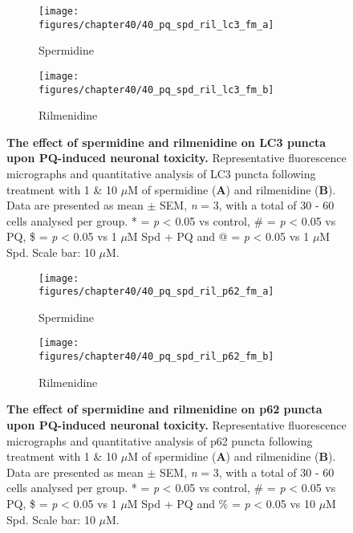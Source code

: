 \begin{figure}[!htbp]
  \center
  \begin{subfigure}[b]{0.495\linewidth}
    \texttt{[image: figures/chapter40/40\_pq\_spd\_ril\_lc3\_fm\_a]}
    \caption{Spermidine}
  \end{subfigure}
  \begin{subfigure}[b]{0.495\linewidth}
    \texttt{[image: figures/chapter40/40\_pq\_spd\_ril\_lc3\_fm\_b]}
    \caption{Rilmenidine}
  \end{subfigure}
  \caption[The effect of spermidine and rilmenidine on LC3 puncta upon PQ-induced neuronal toxicity]{\textbf{The effect of spermidine and rilmenidine on LC3 puncta upon PQ-induced neuronal toxicity.} Representative fluorescence micrographs and quantitative analysis of LC3 puncta following treatment with 1 \& 10 $\mu$M of spermidine (\textbf{A}) and rilmenidine (\textbf{B}). Data are presented as mean $\pm$ SEM, \textit{n} = 3, with a total of 30 - 60 cells analysed per group. * = \textit{p} < 0.05 vs control, \# = \textit{p} < 0.05 vs PQ, \$ = \textit{p} < 0.05 vs 1 $\mu$M Spd + PQ and @ = \textit{p} < 0.05 vs 1 $\mu$M Spd. Scale bar: 10 $\mu$M.}
  \label{fig:40_pq_spd_ril_lc3_fm_a}
\end{figure}

\begin{figure}[!htbp]
  \center
  \begin{subfigure}[b]{0.495\linewidth}
    \texttt{[image: figures/chapter40/40\_pq\_spd\_ril\_p62\_fm\_a]}
    \caption{Spermidine}
  \end{subfigure}
  \begin{subfigure}[b]{0.495\linewidth}
    \texttt{[image: figures/chapter40/40\_pq\_spd\_ril\_p62\_fm\_b]}
    \caption{Rilmenidine}
  \end{subfigure}
  \caption[The effect of spermidine and rilmenidine on p62 puncta upon PQ-induced neuronal toxicity]{\textbf{The effect of spermidine and rilmenidine on p62 puncta upon PQ-induced neuronal toxicity.} Representative fluorescence micrographs and quantitative analysis of p62 puncta following treatment with 1 \& 10 $\mu$M of spermidine (\textbf{A}) and rilmenidine (\textbf{B}). Data are presented as mean $\pm$ SEM, \textit{n} = 3, with a total of 30 - 60 cells analysed per group. * = \textit{p} < 0.05 vs control, \# = \textit{p} < 0.05 vs PQ, \$ = \textit{p} < 0.05 vs 1 $\mu$M Spd + PQ and \% = \textit{p} < 0.05 vs 10 $\mu$M Spd. Scale bar: 10 $\mu$M.}
  \label{fig:40_pq_spd_ril_p62_fm_a}
\end{figure}

